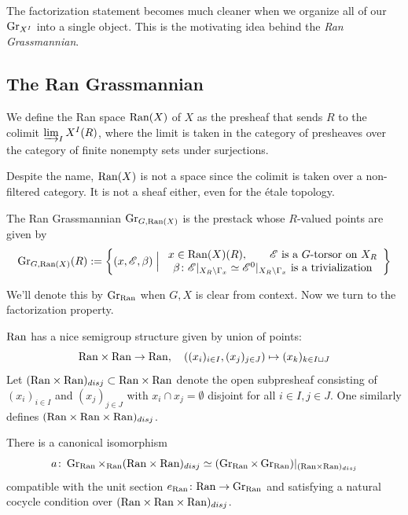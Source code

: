 \documentclass[12pt]{article}
\begin{document}
The factorization statement becomes much cleaner when we organize all of our $\operatorname{Gr}_{X^I}$ into a single object. This is the motivating idea behind the \textit{Ran Grassmannian}.

\subsection{The Ran Grassmannian}

\begin{defn}
    We define the Ran space $\mathrm{Ran}(X)$ of $X$ as the presheaf that sends $R$ to the colimit $\varinjlim_I X^I(R)$, where the limit is taken in the category of presheaves over the category of finite nonempty sets under surjections.
\end{defn}

Despite the name, $\mathrm{Ran}(X)$ is not a space since the colimit is taken over a non-filtered category. It is not a sheaf either, even for the \'etale topology. 

\begin{defn}
    The Ran Grassmannian $\operatorname{Gr}_{G,\mathrm{Ran}(X)}$ is the prestack whose $R$-valued points are given by
    \[\operatorname{Gr}_{G,\mathrm{Ran}(X)}(R) := \left\{(x, \mathscr{E},\beta) \;\Big\vert\; \begin{array}{c}
    x \in \mathrm{Ran}(X)(R),\qquad \mathscr{E} \text{ is a } G \text{-torsor on } X_R \\ 
    \beta \colon \mathscr{E}\vert_{X_R \setminus \Gamma_x} \simeq \mathscr{E}^0\vert_{X_R \setminus \Gamma_x} \text{ is a trivialization} 
    \end{array} \right\}\]
\end{defn}

We'll denote this by $\operatorname{Gr}_{\mathrm{Ran}}$ when $G, X$ is clear from context. Now we turn to the factorization property.

$\mathrm{Ran}$ has a nice semigroup structure given by union of points:
\[\mathrm{Ran} \times \mathrm{Ran} \to \mathrm{Ran}, \quad ((x_i)_{i \in I}, (x_j)_{j \in J}) \mapsto (x_k)_{k \in I \sqcup J}\]
Let $(\mathrm{Ran} \times \mathrm{Ran})_{disj} \subset \mathrm{Ran} \times \mathrm{Ran}$ denote the open subpresheaf consisting of $(x_i)_{i \in I}$ and $(x_j)_{j \in J}$ with $x_i \cap x_j = \emptyset$ disjoint for all $i \in I, j \in J$. One similarly defines $(\mathrm{Ran} \times \mathrm{Ran} \times \mathrm{Ran})_{disj}$. 
\begin{thm}
    There is a canonical isomorphism
    \begin{equation}
        a\colon \operatorname{Gr}_{\mathrm{Ran}} \times_{\mathrm{Ran}} (\mathrm{Ran} \times \mathrm{Ran})_{disj} \simeq (\operatorname{Gr}_{\mathrm{Ran}} \times \operatorname{Gr}_{\mathrm{Ran}})\vert_{(\mathrm{Ran} \times \mathrm{Ran})_{disj}}
    \end{equation}
    compatible with the unit section $e_{\mathrm{Ran}} \colon \mathrm{Ran} \to \operatorname{Gr}_{\mathrm{Ran}}$ and satisfying a natural cocycle condition over $(\mathrm{Ran} \times \mathrm{Ran} \times \mathrm{Ran})_{disj}$.
\end{thm}
\end{document}
